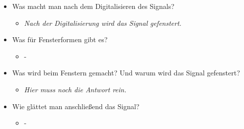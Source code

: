 \documentclass[11pt]{article}
\begin{document}
\begin{itemize}
\begin{itemize}
\end{itemize}
\item Was macht man nach dem Digitalisieren des Signals?
\begin{itemize}
\item \emph{Nach der Digitalisierung wird das Signal gefenstert.}
\end{itemize}
\item Was für Fensterformen gibt es?
\begin{itemize}
\item -
\end{itemize}
\item Was wird beim Fenstern gemacht? Und warum wird das Signal gefenstert?
\begin{itemize}
\item \emph{Hier muss noch die Antwort rein.}
\end{itemize}
\item Wie glättet man anschließend das Signal?
\begin{itemize}
\item -
\end{itemize}
\end{itemize}
\end{document}
